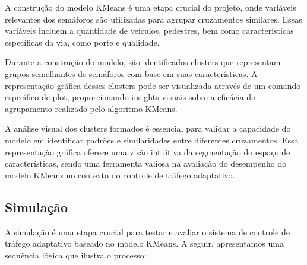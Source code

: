 \documentclass[a4paper, 10pt, conference]{IEEEtran}
\begin{document}
A construção do modelo KMeans é uma etapa crucial do projeto, onde variáveis relevantes dos semáforos são utilizadas para agrupar cruzamentos similares. Essas variáveis incluem a quantidade de veículos, pedestres, bem como características específicas da via, como porte e qualidade.

Durante a construção do modelo, são identificados clusters que representam grupos semelhantes de semáforos com base em suas características. A representação gráfica desses clusters pode ser visualizada através de um comando específico de plot, proporcionando insights visuais sobre a eficácia do agrupamento realizado pelo algoritmo KMeans.

A análise visual dos clusters formados é essencial para validar a capacidade do modelo em identificar padrões e similaridades entre diferentes cruzamentos. Essa representação gráfica oferece uma visão intuitiva da segmentação do espaço de características, sendo uma ferramenta valiosa na avaliação do desempenho do modelo KMeans no contexto do controle de tráfego adaptativo.


\subsection{Simulação}

A simulação é uma etapa crucial para testar e avaliar o sistema de controle de tráfego adaptativo baseado no modelo KMeans. A seguir, apresentamos uma sequência lógica que ilustra o processo:
\end{document}
